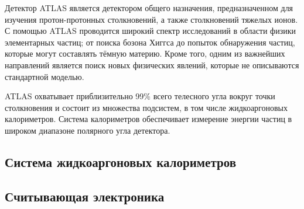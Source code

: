 Детектор ATLAS является детектором общего назначения, предназначенном для изучения протон-протонных столкновений, а также столкновений тяжелых ионов. С помощью ATLAS проводится широкий спектр исследований в области физики элементарных частиц; от поиска бозона Хиггса до попыток обнаружения частиц, которые могут составлять тёмную материю. Кроме того, одним из важнейших направлений является поиск новых физических явлений, которые не описываются стандартной моделью.\par
ATLAS охватывает приблизительно 99\% всего телесного угла вокруг точки столкновения и состоит из множества подсистем, в том числе жидкоаргоновых калориметров. Система калориметров обеспечивает измерение энергии частиц в широком диапазоне полярного угла детектора.\par

\subsection{Система жидкоаргоновых калориметров}

\subsection{Считывающая электроника}

